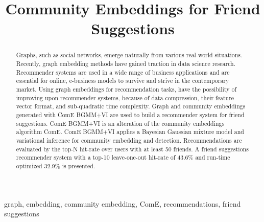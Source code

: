 \documentclass[conference]{IEEEtran}
\begin{document}
\title{Community Embeddings for Friend Suggestions}

\author{
    \and
}

\maketitle

\begin{abstract}
    Graphs, such as social networks, emerge naturally from various real-world situations. Recently, graph embedding methods have gained traction in data science research.
    Recommender systems are used in a wide range of business applications and are essential for online, e-business models to survive and strive in the contemporary market. Using graph embeddings for recommendation tasks, have the possibility of improving upon recommender systems, because of data compression, their feature vector format, and sub-quadratic time complexity.
    Graph and community embeddings generated with ComE BGMM+VI are used to build a recommender system for friend suggestions. ComE BGMM+VI is an alteration of the community embeddings algorithm ComE. ComE BGMM+VI applies a Bayesian Gaussian mixture model and variational inference for community embedding and detection.
    Recommendations are evaluated by the top-N hit-rate over users with at least 50 friends. A friend suggestions recommender system with a top-10 leave-one-out hit-rate of 43.6\% and run-time optimized 32.9\% is presented.
\end{abstract}

\begin{IEEEkeywords}
    graph, embedding, community embedding, ComE, recommendations, friend suggestions
\end{IEEEkeywords}
\end{document}
